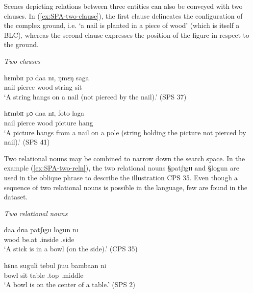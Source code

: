 Scenes depicting  relations between
three entities can also be conveyed with two clauses. In
(\ref{ex:SPA-two-clause}), the first clause delineates the configuration of the
complex ground, i.e. `a nail is planted in a piece of wood' (which is itself
a BLC),  whereas the second clause expresses the position of  the figure in
respect to the ground. 

\begin{exe}
\ex\label{ex:SPA-two-clause}{\it Two clauses}
\begin{xlist}

\ex\label{ex:SPA-SPS-37}
 \gll hɛmbɪɪ pɔ daa nɪ, ŋmɛŋ saga\\
nail pierce wood {\postp} string sit\\
 \glt `A string hangs on a nail (not pierced by the nail).' (SPS 37)

\ex\label{ex:SPA-SPS-41}
 \gll hɛmbɪɪ pɔ daa nɪ, foto laga\\
nail pierce wood {\postp} picture hang\\
 \glt `A picture hangs from a nail on a pole (string holding the picture not
pierced by nail).' (SPS
41)

\end{xlist}
\end{exe}

Two relational nouns may be combined to narrow down the search space. In the 
example  (\ref{ex:SPA-two-reln}),  the two relational nouns  {\S patʃɪgɪɪ} and 
{\S logun}  are used in the oblique phrase to describe the illustration CPS 35.
Even though a sequence of two relational nouns is possible in the language, few
are found in the dataset. 


\begin{exe}
\ex\label{ex:SPA-two-reln}{\it Two relational nouns}
\begin{xlist}

\ex\label{ex:SPA-CPS-35}
 \gll daa dʊa patʃɪgɪɪ logun nɪ \\
wood be.at  {\reln .inside} {\reln .side}  {\postp} \\
 \glt `A stick is in a bowl (on the side).'  (CPS 35)

\ex\label{ex:SPA-SPS-2}
 \gll hɛna suguli tebul ɲuu bambaan nɪ \\
bowl sit table  {\reln .top} {\reln .middle}  {\postp} \\
 \glt `A bowl is on the center of a table.'  (SPS 2)

\end{xlist}
\end{exe}


